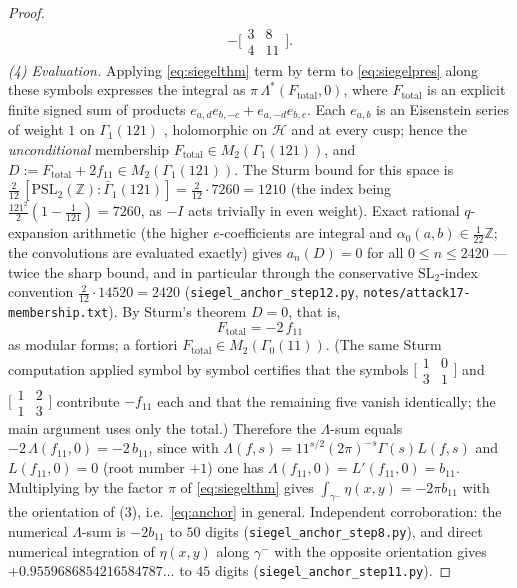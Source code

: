 \documentclass[11pt]{amsart}
\theoremstyle{definition}
\theoremstyle{remark}
\newcommand{\Z}{\mathbb{Z}}
\begin{document}
\begin{proof}
\[\begin{aligned}
   -\bigl[\begin{smallmatrix}3&8\\4&11\end{smallmatrix}\bigr].
\end{aligned}
\]
\emph{(4) Evaluation.}  Applying \eqref{eq:siegelthm} term by term to
\eqref{eq:siegelpres} along these symbols expresses the integral as
$\pi\,\Lambda^*(F_{\mathrm{total}},0)$, where $F_{\mathrm{total}}$ is an
explicit finite signed sum of products
$e_{a,d}e_{b,-c}+e_{a,-d}e_{b,c}$.  Each $e_{a,b}$ is an Eisenstein
series of weight $1$ on $\Gamma_1(121)$
\cite[Definition~10 and Lemma~11]{BrunaultSiegel}, holomorphic on
$\mathcal{H}$ and at every cusp; hence the \emph{unconditional}
membership $F_{\mathrm{total}}\in M_2(\Gamma_1(121))$, and
$D:=F_{\mathrm{total}}+2f_{11}\in M_2(\Gamma_1(121))$.  The Sturm bound
for this space is
$\frac{2}{12}\,[\mathrm{PSL}_2(\Z):\bar\Gamma_1(121)]
 =\frac{2}{12}\cdot 7260=1210$ (the index being
$\frac{121^2}{2}(1-\frac1{121})=7260$, as $-I$ acts trivially in even
weight).  Exact rational $q$-expansion arithmetic (the higher
$e$-coefficients are integral and
$\alpha_0(a,b)\in\frac1{22}\Z$; the convolutions are evaluated exactly)
gives $a_n(D)=0$ for all $0\le n\le 2420$ --- twice the sharp bound, and
in particular through the conservative $\mathrm{SL}_2$-index convention
$\frac{2}{12}\cdot14520=2420$ (\texttt{siegel\_anchor\_step12.py},
\texttt{notes/attack17-membership.txt}).  By Sturm's theorem $D=0$,
that is,
\[
  F_{\mathrm{total}}=-2\,f_{11}
\]
as modular forms; a fortiori $F_{\mathrm{total}}\in M_2(\Gamma_0(11))$.
(The same Sturm computation applied symbol by symbol certifies that the
symbols $\bigl[\begin{smallmatrix}1&0\\3&1\end{smallmatrix}\bigr]$ and
$\bigl[\begin{smallmatrix}1&2\\1&3\end{smallmatrix}\bigr]$ contribute
$-f_{11}$ each and that the remaining five vanish identically; the main
argument uses only the total.)  Therefore the
$\Lambda$-sum equals $-2\,\Lambda(f_{11},0)=-2\,b_{11}$, since with
$\Lambda(f,s)=11^{s/2}(2\pi)^{-s}\Gamma(s)L(f,s)$ and $L(f_{11},0)=0$
(root number $+1$) one has $\Lambda(f_{11},0)=L'(f_{11},0)=b_{11}$.
Multiplying by the factor $\pi$ of \eqref{eq:siegelthm} gives
$\int_{\gamma^-}\eta(x,y)=-2\pi b_{11}$ with the orientation of (3),
i.e.\ \eqref{eq:anchor} in general.  Independent corroboration: the
numerical $\Lambda$-sum is $-2b_{11}$ to $50$ digits
(\texttt{siegel\_anchor\_step8.py}), and direct numerical integration of
$\eta(x,y)$ along $\gamma^-$ with the opposite orientation gives
$+0.9559686854216584787\ldots$ to $45$ digits
(\texttt{siegel\_anchor\_step11.py}).
\end{proof}
\end{document}
